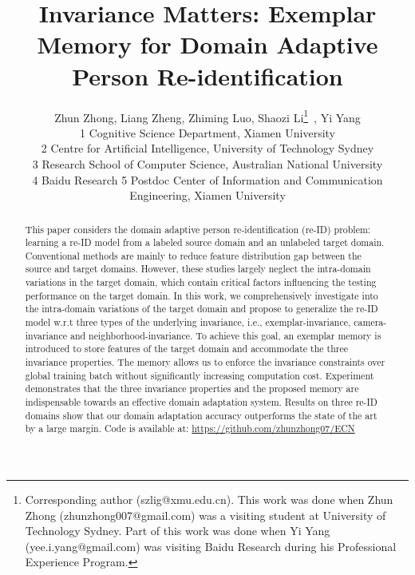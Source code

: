 \documentclass[10pt,twocolumn,letterpaper]{article}
\begin{document}
\title{Invariance Matters: Exemplar Memory for Domain Adaptive \\ Person Re-identification}

\author{Zhun Zhong, Liang Zheng, Zhiming Luo, Shaozi Li\thanks{Corresponding author (szlig@xmu.edu.cn). 
\newline \hspace*{0.16in} This work was done when Zhun Zhong (zhunzhong007@gmail.com) was a visiting student at University of Technology Sydney. Part of this work was done when Yi Yang (yee.i.yang@gmail.com) was visiting Baidu Research during his Professional Experience Program.
}~, Yi Yang \\
 \small{\textcolor{mypink}{1} Cognitive Science Department, Xiamen University} \\
 \small{\textcolor{mypink}{2} Centre for Artificial
Intelligence, University of Technology Sydney}\\ 
\small{\textcolor{mypink}{3} Research School of Computer Science, Australian National University} \\
\small{\small{\textcolor{mypink}{4} Baidu Research} \space \space \textcolor{mypink}{5} Postdoc Center of Information and Communication Engineering, Xiamen University}}

\maketitle
\thispagestyle{empty}

\begin{abstract}

This paper considers the domain adaptive person re-identification (re-ID) problem: learning a re-ID model from a labeled source domain and an unlabeled target domain. Conventional methods are mainly to reduce feature distribution gap between the source and target domains.
However, these studies largely neglect the intra-domain variations in the target domain, which contain critical factors influencing the testing performance on the target domain. 
In this work, we comprehensively investigate into the intra-domain variations of the target domain and propose to generalize the re-ID model w.r.t three types of the underlying invariance, i.e., exemplar-invariance, camera-invariance and neighborhood-invariance. 
To achieve this goal, an exemplar memory is introduced to store features of the target domain and accommodate the three invariance properties. The memory allows us to enforce the invariance constraints over global training batch without significantly increasing computation cost.
Experiment demonstrates that the three invariance properties and the proposed memory are indispensable towards an effective domain adaptation system. 
Results on three re-ID domains show that our domain adaptation accuracy outperforms the state of the art by a large margin. Code is available at: \url{https://github.com/zhunzhong07/ECN}

\end{abstract}
\end{document}
